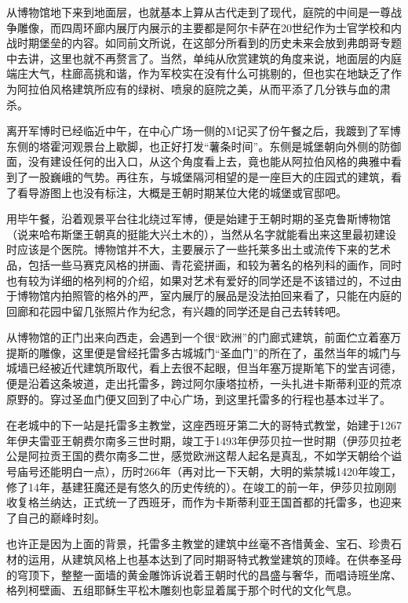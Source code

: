 \documentclass[
]{book}
\begin{document}
从博物馆地下来到地面层，也就基本上算从古代走到了现代，庭院的中间是一尊战争雕像，而四周环廊内展厅内展示的主要都是阿尔卡萨在20世纪作为士官学校和内战时期堡垒的内容。如同前文所说，在这部分所看到的历史未来会放到弗朗哥专题中去讲，这里也就不再赘言了。当然，单纯从欣赏建筑的角度来说，地面层的内庭端庄大气，柱廊高挑和谐，作为军校实在没有什么可挑剔的，但也实在地缺乏了作为阿拉伯风格建筑所应有的绿树、喷泉的庭院之美，从而平添了几分铁与血的肃杀。

离开军博时已经临近中午，在中心广场一侧的M记买了份午餐之后，我踱到了军博东侧的塔霍河观景台上歇脚，也正好打发``薯条时间''。东侧是城堡朝向外侧的防御面，没有建设任何的出入口，从这个角度看上去，竟也能从阿拉伯风格的典雅中看到了一股巍峨的气势。再往东，与城堡隔河相望的是一座巨大的庄园式的建筑，看了看导游图上也没有标注，大概是王朝时期某位大佬的城堡或官邸吧。

用毕午餐，沿着观景平台往北绕过军博，便是始建于王朝时期的圣克鲁斯博物馆（说来哈布斯堡王朝真的挺能大兴土木的），当然从名字就能看出来这里最初建设时应该是个医院。博物馆并不大，主要展示了一些托莱多出土或流传下来的艺术品，包括一些马赛克风格的拼画、青花瓷拼画，和较为著名的格列科的画作，同时也有较为详细的格列柯的介绍，如果对艺术有爱好的同学还是不该错过的，不过由于博物馆内拍照管的格外的严，室内展厅的展品是没法拍回来看了，只能在内庭的回廊和花园中留几张照片作为纪念，有兴趣的同学还是自己去转转吧。

从博物馆的正门出来向西走，会遇到一个很``欧洲''的门廊式建筑，前面伫立着塞万提斯的雕像，这里便是曾经托雷多古城城门``圣血门''的所在了，虽然当年的城门与城墙已经被近代建筑所取代，看上去很不起眼，但当年塞万提斯笔下的堂吉诃德，便是沿着这条坡道，走出托雷多，跨过阿尔康塔拉桥，一头扎进卡斯蒂利亚的荒凉原野的。穿过圣血门便又回到了中心广场，到这里托雷多的行程也基本过半了。

在老城中的下一站是托雷多主教堂，这座西班牙第二大的哥特式教堂，始建于1267年伊夫雷亚王朝费尔南多三世时期，竣工于1493年伊莎贝拉一世时期（伊莎贝拉老公是阿拉贡王国的费尔南多二世，感觉欧洲这帮人起名是真乱，不如学天朝给个谥号庙号还能明白一点），历时266年（再对比一下天朝，大明的紫禁城1420年竣工，修了14年，基建狂魔还是有悠久的历史传统的）。在竣工的前一年，伊莎贝拉刚刚收复格兰纳达，正式统一了西班牙，而作为卡斯蒂利亚王国首都的托雷多，也迎来了自己的巅峰时刻。

也许正是因为上面的背景，托雷多主教堂的建筑中丝毫不吝惜黄金、宝石、珍贵石材的运用，从建筑风格上也基本达到了同时期哥特式教堂建筑的顶峰。在供奉圣母的穹顶下，整整一面墙的黄金雕饰诉说着王朝时代的昌盛与奢华，而唱诗班坐席、格列柯壁画、五组耶稣生平松木雕刻也彰显着属于那个时代的文化气息。
\end{document}
